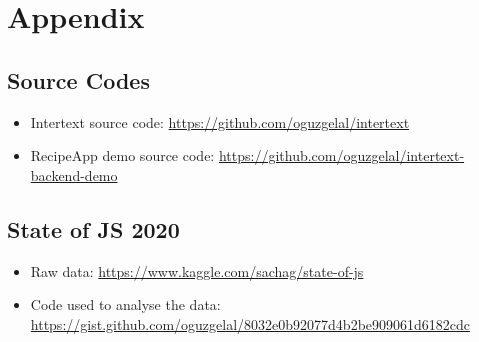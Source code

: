 \chapter{Appendix} \label{App:AppendixA}

\section{Source Codes}

\begin{itemize}
    \item Intertext source code: \url{https://github.com/oguzgelal/intertext}
    
    \item RecipeApp demo source code: \url{https://github.com/oguzgelal/intertext-backend-demo}
\end{itemize}



\section{State of JS 2020}

\begin{itemize}
    \item Raw data: \url{https://www.kaggle.com/sachag/state-of-js}
    \item Code used to analyse the data: \url{https://gist.github.com/oguzgelal/8032e0b92077d4b2be909061d6182cdc}
\end{itemize}



 
